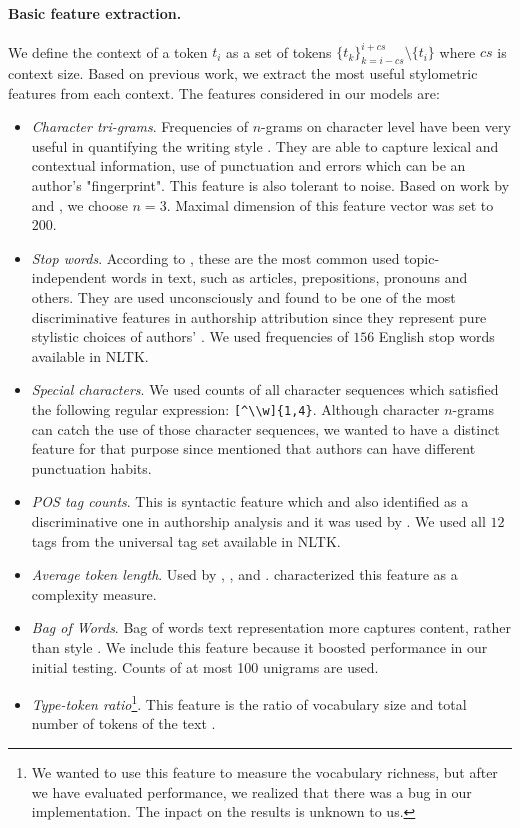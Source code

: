 \documentclass[10pt, a4paper]{article}
\begin{document}
\paragraph{Basic feature extraction.} 
We define the context of a token $t_i$ as a set of tokens $\{t_k\}_{k=i-cs}^{i+cs}\setminus\{t_i\}$ where $cs$ is context size. Based on previous work, we extract the most useful stylometric features from each context. The features considered in our models are:
\begin{itemize}
	\item \emph{Character tri-grams}. Frequencies of $n$-grams on character level have been very useful in quantifying the writing style \citep{stamatatos-2009b}. They are able to capture lexical and contextual information, use of punctuation and errors which can be an author's "fingerprint". This feature is also tolerant to noise. Based on work by \citet{stamatatos-2009a} and \citet{rahman-2015}, we choose $n=3$. Maximal dimension of this feature vector was set to $200$.
	\item \emph{Stop words}. According to \citet{stamatatos-2009a}, these are the most common used topic-independent words in text, such as articles, prepositions, pronouns and others. They are used unconsciously and found to be one of the most discriminative features in authorship attribution since they represent pure stylistic choices of authors' \citep{burrows-1987,argamon-2005}. We used frequencies of $156$ English stop words available in NLTK.
	\item \emph{Special characters}. We used counts of all character sequences which satisfied the following regular expression: \verb/[^\\w]{1,4}/. Although character $n$-grams can catch the use of those character sequences, we wanted to have a distinct feature for that purpose since \citet{koppel-2009} mentioned that authors can have different punctuation habits.
	\item \emph{POS tag counts}. This is syntactic feature which \citet{koppel-2009} and \citet{stamatatos-2009a} also identified as a discriminative one in authorship analysis and it was used by \citet{kuznetsov-2016}. We used all $12$ tags from the universal tag set available in NLTK.
	\item \emph{Average token length}. Used by \citet{kuznetsov-2016}, \citet{sittar-2016},  \citet{brooke-2012} and \citet{stein-2011}. \citet{koppel-2009} characterized this feature as a complexity measure.
	\item \emph{Bag of Words}. Bag of words text representation more captures content, rather than style \citep{stamatatos-2009a}. We include this feature because it boosted performance in our initial testing. Counts of at most 100 unigrams are used.
	\item \emph{Type-token ratio}\footnote{We wanted to use this feature to measure the vocabulary richness, but after we have evaluated performance, we realized that there was a bug in our implementation. The inpact on the results is unknown to us.}. This feature is the ratio of vocabulary size and total number of tokens of the text \citep{stamatatos-2009a}.
\end{itemize}
\end{document}
